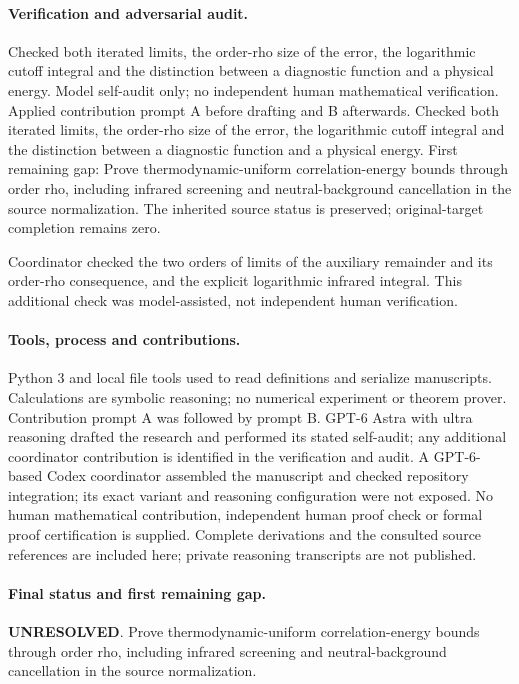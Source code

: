 \documentclass[11pt]{article}
\begin{document}
\paragraph{Verification and adversarial audit.}
Checked both iterated limits, the order-rho size of the error, the logarithmic cutoff integral and the distinction between a diagnostic function and a physical energy. Model self-audit only; no independent human mathematical verification. Applied contribution prompt A before drafting and B afterwards. Checked both iterated limits, the order-rho size of the error, the logarithmic cutoff integral and the distinction between a diagnostic function and a physical energy. First remaining gap: Prove thermodynamic-uniform correlation-energy bounds through order rho, including infrared screening and neutral-background cancellation in the source normalization. The inherited source status is preserved; original-target completion remains zero.

Coordinator checked the two orders of limits of the auxiliary remainder and its order-rho consequence, and the explicit logarithmic infrared integral. This additional check was model-assisted, not independent human verification.

\paragraph{Tools, process and contributions.}
Python 3 and local file tools used to read definitions and serialize manuscripts. Calculations are symbolic reasoning; no numerical experiment or theorem prover. Contribution prompt A was followed by prompt B. GPT-6 Astra with ultra reasoning drafted the research and performed its stated self-audit; any additional coordinator contribution is identified in the verification and audit. A GPT-6-based Codex coordinator assembled the manuscript and checked repository integration; its exact variant and reasoning configuration were not exposed. No human mathematical contribution, independent human proof check or formal proof certification is supplied. Complete derivations and the consulted source references are included here; private reasoning transcripts are not published.

\paragraph{Final status and first remaining gap.}
\textbf{UNRESOLVED}. Prove thermodynamic-uniform correlation-energy bounds through order rho, including infrared screening and neutral-background cancellation in the source normalization.
\end{document}
